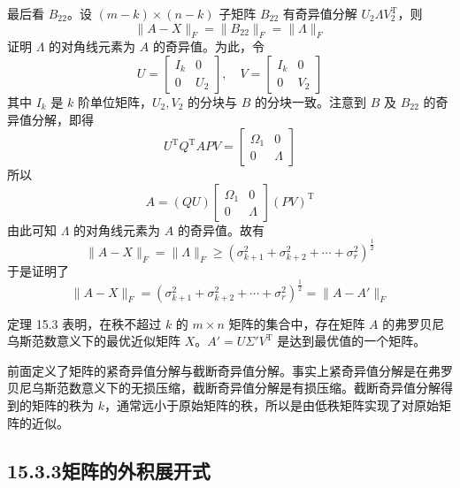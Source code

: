 \documentclass[UTF8, 12pt, fontset=fandol, oneside]{ctexart}
\begin{document}
最后看 $B_{22}$。设 $(m-k)\times(n-k)$ 子矩阵 $B_{22}$ 有奇异值分解 $U_2\Lambda V_2^{\mathrm{T}}$，则
\begin{equation}
\|A-X\|_F=\|B_{22}\|_F=\|\Lambda\|_F
\tag{15.41}
\end{equation}
证明 $\Lambda$ 的对角线元素为 $A$ 的奇异值。为此，令
\[
U=
\begin{bmatrix}
I_k&0\\
0&U_2
\end{bmatrix},\quad
V=
\begin{bmatrix}
I_k&0\\
0&V_2
\end{bmatrix}
\]
其中 $I_k$ 是 $k$ 阶单位矩阵，$U_2,V_2$ 的分块与 $B$ 的分块一致。注意到 $B$ 及 $B_{22}$ 的奇异值分解，即得
\begin{equation}
U^{\mathrm{T}}Q^{\mathrm{T}}APV=
\begin{bmatrix}
\Omega_1&0\\
0&\Lambda
\end{bmatrix}
\tag{15.42}
\end{equation}
所以
\begin{equation}
A=(QU)
\begin{bmatrix}
\Omega_1&0\\
0&\Lambda
\end{bmatrix}
(PV)^{\mathrm{T}}
\tag{15.43}
\end{equation}
由此可知 $\Lambda$ 的对角线元素为 $A$ 的奇异值。故有
\begin{equation}
\|A-X\|_F=\|\Lambda\|_F\geqslant
(\sigma_{k+1}^2+\sigma_{k+2}^2+\cdots+\sigma_r^2)^{\frac12}
\tag{15.44}
\end{equation}
于是证明了
\[
\|A-X\|_F=(\sigma_{k+1}^2+\sigma_{k+2}^2+\cdots+\sigma_r^2)^{\frac12}
=\|A-A'\|_F
\]

定理 15.3 表明，在秩不超过 $k$ 的 $m\times n$ 矩阵的集合中，存在矩阵 $A$ 的弗罗贝尼乌斯范数意义下的最优近似矩阵 $X$。$A'=U\Sigma'V^{\mathrm{T}}$ 是达到最优值的一个矩阵。

前面定义了矩阵的紧奇异值分解与截断奇异值分解。事实上紧奇异值分解是在弗罗贝尼乌斯范数意义下的无损压缩，截断奇异值分解是有损压缩。截断奇异值分解得到的矩阵的秩为 $k$，通常远小于原始矩阵的秩，所以是由低秩矩阵实现了对原始矩阵的近似。

\subsection*{15.3.3\quad 矩阵的外积展开式}
\end{document}
